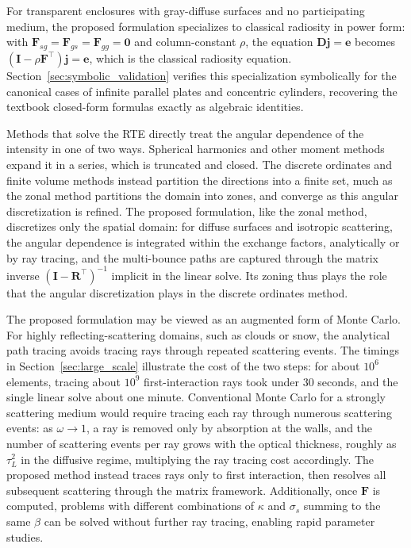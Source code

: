 \documentclass[preprint,1p,times]{elsarticle}
\theoremstyle{plain}
\theoremstyle{definition}
\theoremstyle{remark}
\begin{document}
For transparent enclosures with gray-diffuse surfaces and no participating medium, the proposed formulation specializes to classical radiosity in power form: with $\mathbf{F}_{sg} = \mathbf{F}_{gs} = \mathbf{F}_{gg} = \mathbf{0}$ and column-constant $\rho$, the equation $\mathbf{D}\mathbf{j} = \mathbf{e}$ becomes $(\mathbf{I} - \rho\mathbf{F}^\top)\mathbf{j} = \mathbf{e}$, which is the classical radiosity equation. Section~\ref{sec:symbolic_validation} verifies this specialization symbolically for the canonical cases of infinite parallel plates and concentric cylinders, recovering the textbook closed-form formulas exactly as algebraic identities.

Methods that solve the RTE directly treat the angular dependence of the intensity in one of two ways. Spherical harmonics and other moment methods expand it in a series, which is truncated and closed. The discrete ordinates and finite volume methods instead partition the directions into a finite set, much as the zonal method partitions the domain into zones, and converge as this angular discretization is refined. The proposed formulation, like the zonal method, discretizes only the spatial domain: for diffuse surfaces and isotropic scattering, the angular dependence is integrated within the exchange factors, analytically or by ray tracing, and the multi-bounce paths are captured through the matrix inverse $(\mathbf{I} - \mathbf{R}^\top)^{-1}$ implicit in the linear solve. Its zoning thus plays the role that the angular discretization plays in the discrete ordinates method.

The proposed formulation may be viewed as an augmented form of Monte Carlo. For highly reflecting-scattering domains, such as clouds or snow, the analytical path tracing avoids tracing rays through repeated scattering events. The timings in Section~\ref{sec:large_scale} illustrate the cost of the two steps: for about $10^6$ elements, tracing about $10^9$ first-interaction rays took under 30 seconds, and the single linear solve about one minute. Conventional Monte Carlo for a strongly scattering medium would require tracing each ray through numerous scattering events: as $\omega \to 1$, a ray is removed only by absorption at the walls, and the number of scattering events per ray grows with the optical thickness, roughly as $\tau_L^2$ in the diffusive regime, multiplying the ray tracing cost accordingly. The proposed method instead traces rays only to first interaction, then resolves all subsequent scattering through the matrix framework. Additionally, once $\mathbf{F}$ is computed, problems with different combinations of $\kappa$ and $\sigma_s$ summing to the same $\beta$ can be solved without further ray tracing, enabling rapid parameter studies.
\end{document}
